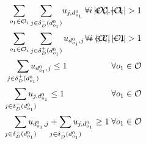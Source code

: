 \begin{alignat}{3}
    \label{mod:c11}        & \sum_{ \substack{o_1 \in \mathcal{O}_i }}{ \sum_{ j \in \delta^{-}_{D}(d^0_{o_1})}}{u_{j,d^0_{o_1} } } = |\mathcal{O}_i|-1                                                                                                                                                                       & \hspace{-20mm} \forall  i \in \mathcal{C},|\mathcal{O}_i| > 1                                    \\
    \label{mod:c12}        & \sum_{ \substack{o_1 \in \mathcal{O}_i }}\sum_{ j \in \delta^{+}_{D}(d^0_{o_1})}{u_{d^0_{o_1},j } } = |\mathcal{O}_i|-1                                                                                                                                                                          & \hspace{-40mm} \forall  i \in \mathcal{C}, |\mathcal{O}_i| > 1                                   \\
    \label{mod:c13}        & \hspace{3mm} \smashoperator{ \sum_{ j \in \delta^{+}_{D}(d^0_{o_1})}}{u_{d^0_{o_1},j } } \leq 1                                                                                                                                                                                                  & \hspace{-20mm}  \forall o_1 \in \mathcal{O}                                                      \\
    \label{mod:c14}        & \hspace{2mm} \smashoperator{ \sum_{ j \in \delta^{-}_{D}(d^0_{o_1})}}{u_{j,d^0_{o_1} } } \leq 1                                                                                                                                                                                                  & \hspace{-20mm} \forall o_1 \in \mathcal{O}                                                       \\
    \label{mod:c15}        & \hspace{2mm} \smashoperator{ \sum_{ j \in \delta^{+}_{D}(d^0_{o_1})}}{u_{d^0_{o_1},j } } +\smashoperator{ \sum_{ j \in \delta^{-}_{D}(d^0_{o_1})}}{u_{j,d^0_{o_1} } } \geq 1                                                                                                                     & \hspace{-20mm} \forall o_1 \in \mathcal{O}                                                       \\

\end{alignat}
